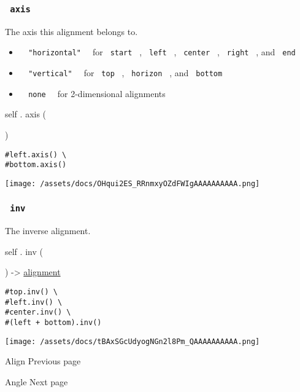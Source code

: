 \subsubsection{\texorpdfstring{\texttt{\ axis\ }}{ axis }}\label{definitions-axis}

The axis this alignment belongs to.

\begin{itemize}
\tightlist
\item
  \texttt{\ }{\texttt{\ "horizontal"\ }}\texttt{\ } for
  \texttt{\ start\ } , \texttt{\ left\ } , \texttt{\ center\ } ,
  \texttt{\ right\ } , and \texttt{\ end\ }
\item
  \texttt{\ }{\texttt{\ "vertical"\ }}\texttt{\ } for \texttt{\ top\ } ,
  \texttt{\ horizon\ } , and \texttt{\ bottom\ }
\item
  \texttt{\ }{\texttt{\ none\ }}\texttt{\ } for 2-dimensional alignments
\end{itemize}

self { . } { axis } (

)

\begin{verbatim}
#left.axis() \
#bottom.axis()
\end{verbatim}

\texttt{[image: /assets/docs/OHqui2ES\_RRnmxyOZdFWIgAAAAAAAAAA.png]}

\subsubsection{\texorpdfstring{\texttt{\ inv\ }}{ inv }}\label{definitions-inv}

The inverse alignment.

self { . } { inv } (

) -\textgreater{} \href{/docs/reference/layout/alignment/}{alignment}

\begin{verbatim}
#top.inv() \
#left.inv() \
#center.inv() \
#(left + bottom).inv()
\end{verbatim}

\texttt{[image: /assets/docs/tBAxSGcUdyogNGn2l8Pm\_QAAAAAAAAAA.png]}

\href{/docs/reference/layout/align/}{\pandocbounded{}}

{ Align } { Previous page }

\href{/docs/reference/layout/angle/}{\pandocbounded{}}

{ Angle } { Next page }
